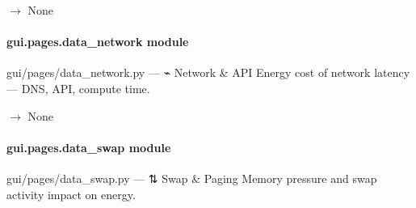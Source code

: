 \documentclass[letterpaper,10pt,english]{sphinxmanual}
\begin{document}
\begin{fulllineitems}
\label{\detokenize{gui.pages.data_interrupts:gui.pages.data_interrupts.render}}
\pysigstartsignatures
\pysiglinewithargsret
{}
{}
{{ $\rightarrow$ None}}
\pysigstopsignatures
\end{fulllineitems}


\sphinxstepscope


\paragraph{gui.pages.data\_network module}
\label{\detokenize{gui.pages.data_network:module-gui.pages.data_network}}\label{\detokenize{gui.pages.data_network:gui-pages-data-network-module}}\label{\detokenize{gui.pages.data_network::doc}}
\sphinxAtStartPar
gui/pages/data\_network.py  —  ⌁  Network \& API
Energy cost of network latency — DNS, API, compute time.

\begin{fulllineitems}
\label{\detokenize{gui.pages.data_network:gui.pages.data_network.render}}
\pysigstartsignatures
\pysiglinewithargsret
{}
{}
{{ $\rightarrow$ None}}
\pysigstopsignatures
\end{fulllineitems}


\sphinxstepscope


\paragraph{gui.pages.data\_swap module}
\label{\detokenize{gui.pages.data_swap:module-gui.pages.data_swap}}\label{\detokenize{gui.pages.data_swap:gui-pages-data-swap-module}}\label{\detokenize{gui.pages.data_swap::doc}}
\sphinxAtStartPar
gui/pages/data\_swap.py  —  ⇅  Swap \& Paging
Memory pressure and swap activity impact on energy.
\end{document}
